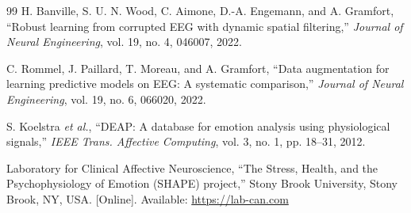 \documentclass[conference]{IEEEtran}
\begin{document}
\begin{thebibliography}{99}
H. Banville, S. U. N. Wood, C. Aimone, D.-A. Engemann, and A. Gramfort, ``Robust learning from corrupted EEG with dynamic spatial filtering,'' \emph{Journal of Neural Engineering}, vol. 19, no. 4, 046007, 2022.

C. Rommel, J. Paillard, T. Moreau, and A. Gramfort, ``Data augmentation for learning predictive models on EEG: A systematic comparison,'' \emph{Journal of Neural Engineering}, vol. 19, no. 6, 066020, 2022.

S. Koelstra \emph{et al.}, ``DEAP: A database for emotion analysis using physiological signals,'' \emph{IEEE Trans. Affective Computing}, vol. 3, no. 1, pp. 18--31, 2012.

Laboratory for Clinical Affective Neuroscience, ``The Stress, Health, and the Psychophysiology of Emotion (SHAPE) project,'' Stony Brook University, Stony Brook, NY, USA. [Online]. Available: \url{https://lab-can.com}

\end{thebibliography}
\end{document}
